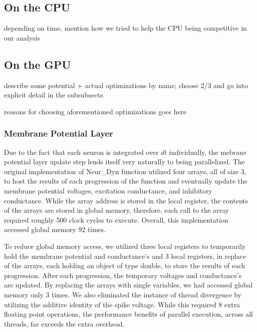 \documentclass[a4paper]{article}
\begin{document}
\subsection{On the CPU}

{\color{red} depending on time, mention how we tried to help the CPU being competitive in our analysis}

\subsection{On the GPU}

{\color{red} describe some potential + actual optimizations by name; choose 2/3 and go into explicit detail in the subsubsects.}

{\color{red} reasons for choosing aforementioned optimizations goes here}

\subsubsection{Membrane Potential Layer}
Due to the fact that each neuron is integrated over $dt$ individually, the mebrane potential layer update step lends itself very naturally to being parallelized. The original implementation of Neur\_Dyn function utilized four arrays, all of size 3, to host the results of each progression of the function and eventually update the membrane potential voltages, excitation conductance, and inhibitory conductance. While the array address is stored in the local register, the contents of the arrays are stored in global memory, therefore, each call to the array required roughly 500 clock cycles to execute. Overall, this implementation accessed global memory 92 times.

To reduce global memory access, we utilized three local registers to temporarily hold the membrane potential and conductance's and 3 local registers, in replace of the arrays, each holding an object of type double, to store the results of each progression. After each progression, the temporary voltages and conductance's are updated. By replacing the arrays with single variables, we had accessed global memory only 3 times. We also eliminated the instance of thread divergence by utilizing the additive identity of the spike voltage. While this required 8 extra floating point operations, the performance benefits of parallel execution, across all threads, far exceeds the extra overhead.
\end{document}
